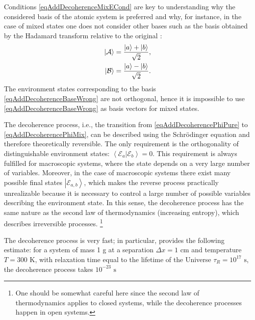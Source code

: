 Conditions \eqref{eqAddDecoherenceMixECond} are key to understanding why the considered basis of the atomic system is
preferred and why, for instance, in the case of mixed states one does not
consider other bases such as the basis obtained by the Hadamard transform relative to the original :
\begin{eqnarray}
\left|\mathcal{A}\right> = \frac{\ket{a} + \ket{b}}
              {\sqrt{2}},
\nonumber \\
\left|\mathcal{B}\right> = \frac{\ket{a} - \ket{b}}
              {\sqrt{2}}.
\label{eqAddDecoherenceBaseWrong}
\end{eqnarray}
The environment states corresponding to the basis
\eqref{eqAddDecoherenceBaseWrong} are not orthogonal, hence it is impossible to use \eqref{eqAddDecoherenceBaseWrong}
as basis vectors for mixed states. 

The decoherence process, i.e., the transition from
\eqref{eqAddDecoherencePhiPure} to \eqref{eqAddDecoherencePhiMix}, can
be described using the Schrödinger equation and therefore
theoretically reversible. The only requirement is the orthogonality of distinguishable environment states: 
$\left<\mathcal{E}_a\right.\left|\mathcal{E}_b\right> = 0$. This
requirement is always fulfilled for macroscopic systems, where
the state depends on a very large number of variables. Moreover,
in the case of macroscopic systems there exist many possible final states
$\left|\mathcal{E}_{a,b}\right>$,
which makes the reverse process practically unrealizable
because it is necessary to control a large number of possible
variables describing the environment state. In this sense,
the decoherence process has the same nature as the second law of thermodynamics 
(increasing entropy), which describes
irreversible processes.
\footnote{One should be somewhat careful here
  since the second law of thermodynamics applies to closed systems, while
  the decoherence processes happen in open systems.}

The decoherence process is very fast; in particular,
\cite{bZurek02} provides the following estimate: for a system of mass 1
g at a separation $\Delta x = 1 \mbox{ cm}$ and temperature $T=300
\mbox{ K}$, with relaxation time equal to the lifetime of the Universe
$\tau_R = 10^{17} \mbox{ s}$, the decoherence process takes $10^{-23}
\mbox{ s}$ 

